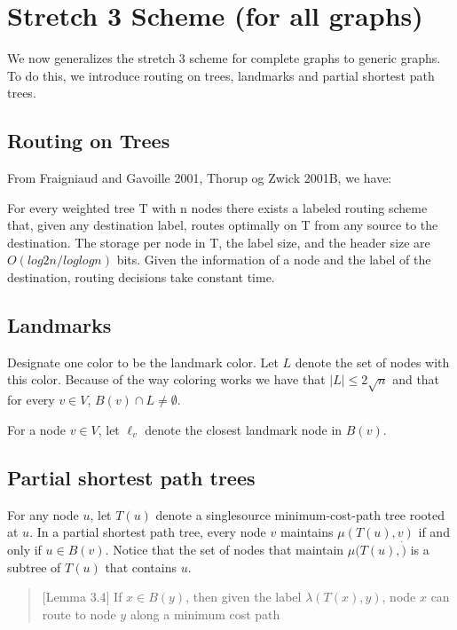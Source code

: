 \section{Stretch 3 Scheme (for all graphs)}
We now generalizes the stretch 3 scheme for complete graphs to generic graphs. To do this, we introduce routing on trees, landmarks and partial shortest path trees.

\subsection{Routing on Trees}
From Fraigniaud and Gavoille 2001, Thorup og Zwick 2001B, we have: %

For every weighted tree T with n nodes there exists a labeled routing scheme that, given any destination label, routes optimally on T from any source to the destination. The storage per node in T, the label size, and the header size are $O(log2 n/ log log n)$ bits. Given the information of a node and the label of the destination, routing decisions take constant time.

\subsection{Landmarks}
Designate one color to be the landmark color. Let $L$ denote the set of nodes with this color. Because of the way coloring works we have that $|L| \leq 2 \sqrt{n}$ and that for every $v\in V$, $B(v)\cap L \neq \emptyset$.

For a node $v\in V$, let $\ell_v$ denote the closest landmark node in $B(v)$.

\subsection{Partial shortest path trees}
For any node $u$, let $T(u)$ denote a singlesource minimum-cost-path tree rooted at $u$. In a partial shortest path tree, every node $v$ maintains $\mu(T(u),v)$ if and only if $u \in B(v)$. Notice that the set of nodes that maintain $\mu(T(u),\dot)$ is a subtree of $T(u)$ that contains $u$.

\begin{quote}[Lemma 3.4]
    If $x \in B(y)$, then given the label $\lambda(T(x), y)$, node $x$ can
    route to node $y$ along a minimum cost path
\end{quote}

